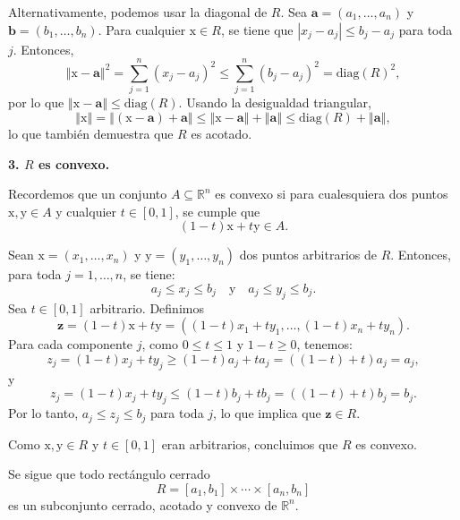 \documentclass[12pt]{article}
\newcommand{\abs}[1]{\left\vert#1\right\vert}
\newcommand{\norm}[1]{\left\Vert#1\right\Vert}
\newcommand{\diag}{\mathrm{diag}}
\newcommand{\R}{\mathbb R}
\newcommand{\x}{\mathrm x}
\newcommand{\y}{\mathrm y}
\begin{document}
\begin{enumerate}
Alternativamente, podemos usar la diagonal de $R$. Sea $\mathbf{a} = (a_1, \ldots, a_n)$ y $\mathbf{b} = (b_1, \ldots, b_n)$. Para cualquier $\x \in R$, se tiene que $\abs{x_j - a_j} \leq b_j - a_j$ para toda $j$. Entonces,
\[
\norm{\x - \mathbf{a}}^2 = \sum_{j=1}^{n} (x_j - a_j)^2 \leq \sum_{j=1}^{n} (b_j - a_j)^2 = \diag(R)^2,
\]
por lo que $\norm{\x - \mathbf{a}} \leq \diag(R)$. Usando la desigualdad triangular,
\[
\norm{\x} = \norm{(\x - \mathbf{a}) + \mathbf{a}} \leq \norm{\x - \mathbf{a}} + \norm{\mathbf{a}} \leq \diag(R) + \norm{\mathbf{a}},
\]
lo que también demuestra que $R$ es acotado.

\textbf{3. $R$ es convexo.}

Recordemos que un conjunto $A \subseteq \R^n$ es convexo si para cualesquiera dos puntos $\x, \y \in A$ y cualquier $t \in [0,1]$, se cumple que
\[
(1-t)\x + t\y \in A.
\]

Sean $\x = (x_1, \ldots, x_n)$ y $\y = (y_1, \ldots, y_n)$ dos puntos arbitrarios de $R$. Entonces, para toda $j = 1, \ldots, n$, se tiene:
\[
a_j \leq x_j \leq b_j \quad \text{y} \quad a_j \leq y_j \leq b_j.
\]
Sea $t \in [0,1]$ arbitrario. Definimos
\[
\mathbf{z} = (1-t)\x + t\y = ((1-t)x_1 + ty_1, \ldots, (1-t)x_n + ty_n).
\]
Para cada componente $j$, como $0 \leq t \leq 1$ y $1-t \geq 0$, tenemos:
\[
z_j = (1-t)x_j + ty_j \geq (1-t)a_j + ta_j = ((1-t) + t)a_j = a_j,
\]
y
\[
z_j = (1-t)x_j + ty_j \leq (1-t)b_j + tb_j = ((1-t) + t)b_j = b_j.
\]
Por lo tanto, $a_j \leq z_j \leq b_j$ para toda $j$, lo que implica que $\mathbf{z} \in R$.

Como $\x, \y \in R$ y $t \in [0,1]$ eran arbitrarios, concluimos que $R$ es convexo.

Se sigue que todo rectángulo cerrado
\[
R = [a_1,b_1]\times \cdots\times [a_n,b_n]
\]
es un subconjunto cerrado, acotado y convexo de $\R^n$.

\end{enumerate}
\end{document}
